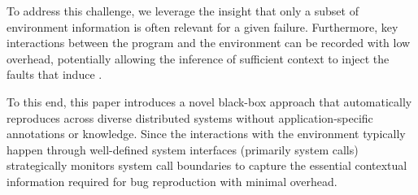 To address this challenge, we leverage the insight that only a subset of environment information is often relevant for a given failure.
Furthermore, key interactions between the program and the environment can be recorded with low overhead, potentially allowing the inference of sufficient context to inject the faults that induce \efibshort. 

To this end, this paper introduces a novel black-box approach that automatically reproduces \efibshort across diverse distributed systems without application-specific annotations or knowledge.
Since the interactions with the environment typically happen through well-defined system interfaces (primarily system calls) \sys strategically monitors system call boundaries to capture the essential contextual information required for bug reproduction with minimal overhead.

